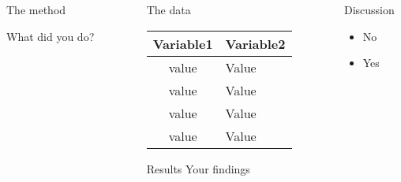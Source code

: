 \documentclass[final,hyperref={pdfpagelabels=false},xcolor=table]{beamer}
\newcommand{\shrink}{-15pt}
\begin{document}
\begin{frame}[t]
\begin{columns}[t]
\begin{column}{.3\textwidth}
    \begin{block}{The method}
     
    What did you do?
    
    \end{block}

  \end{column} %
\begin{column}{.02\textwidth}\end{column} %


  
  \begin{column}{.3\textwidth} %
    \vspace{\shrink}
    
          \begin{block}{The data}
      \setlength{\tabcolsep}{0.5em} %
    {\renewcommand{\arraystretch}{1.2}%
  \begin{tabular}{|c|p{15cm}<{\centering}|}
  \hline
    Variable1 & Variable2\\
    \hline
    value & Value \\
    \hline
    value & Value \\
    \hline
    value & Value\\
    \hline
    value & Value \\
    \hline
\end{tabular}
}
     
    \end{block}
    
    \begin{block}{Results}
    Your findings
     
    \end{block}
      

  \end{column} %
\begin{column}{.02\textwidth}\end{column} %

  \begin{column}{.3\textwidth} %

    \begin{block}{Discussion}
     \begin{itemize}
          \item No
          \item Yes
     \end{itemize}


\end{block}
\end{column}
\end{columns}
\end{frame}
\end{document}
